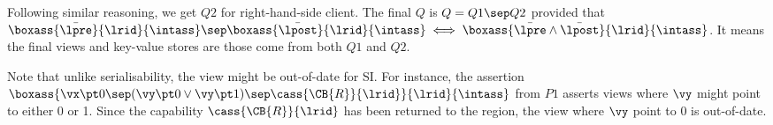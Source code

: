 Following similar reasoning, we get \( Q2 \) for right-hand-side client.
The final \( Q \) is  \( Q = Q1 \sep Q2 \) provided that \( \boxass{\bar{\lpre}}{\lrid}{\intass} \sep \boxass{\bar{\lpost}}{\lrid}{\intass} \iff \boxass{\bar{\lpre} \land \bar{\lpost}}{\lrid}{\intass}\).
It means the final views and key-value stores are those come from both \( Q1 \) and \( Q2 \).






Note that unlike serialisability, the view might be out-of-date for SI.
For instance, the assertion \( \boxass{\vx \pt 0 \sep ( \vy \pt 0 \lor \vy \pt 1 ) \sep \cass{\CB{R}}{\lrid} }{\lrid}{\intass}\) from \( P1 \) asserts views where \( \vy \) might point to either 0 or 1.
Since the capability \( \cass{\CB{R}}{\lrid} \) has been returned to the region, the view where \( \vy \) point to 0 is out-of-date.




